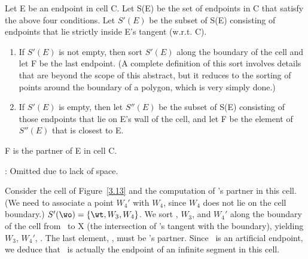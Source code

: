 \begin{theorem}
\label{thm-pair}
Let E be an endpoint in cell C.
Let S(E) be the set of endpoints in C that satisfy the above four conditions.
Let $S'(E)$ be the subset of S(E) consisting of endpoints that lie 
strictly inside E's tangent (w.r.t. C).
\begin{enumerate}
\item
	If $S'(E)$ is not empty, 
then sort $S'(E)$ along the boundary of the cell 
and let F be the last endpoint.
(A complete definition of this sort involves details that are beyond 
the scope of this abstract, but it reduces to the sorting of points
around the boundary of a polygon, which is very simply done.)
%
%
%
\item
	If $S'(E)$ is empty, then let $S''(E)$ be the subset of S(E) consisting
of those endpoints that lie on E's wall of the cell, and
let F be the element of $S''(E)$ that is closest to E.
\end{enumerate}
F is the partner of E in cell C.
\end{theorem}
:
Omitted due to lack of space.
\QED
%
\begin{example}
Consider the cell of Figure~\ref{3.13} and the computation of \wo's partner
in this cell.
(We need to associate a point $W_{4}'$ with $W_{4}$, since $W_{4}$ does
not lie on the cell boundary.)
$S'(\wo) = \{\wt,W_{3},W_{4}\}$. We sort \wt, $W_{3}$, and $W_{4}'$ 
along the boundary of the cell from \wo\ to X (the intersection
of \wo's tangent with the boundary), yielding $W_{3}$, $W_{4}'$, \wt.
The last element, \wt, must be \wo's partner.
Since \wt\ is an artificial endpoint, we deduce that \wo\ is actually
the endpoint of an infinite segment in this cell.
\end{example}


